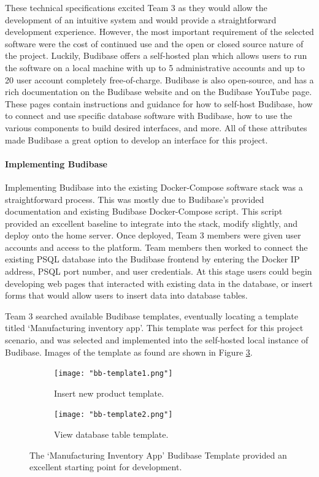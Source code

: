 \documentclass{article}
\begin{document}
These technical specifications excited Team 3 as they would allow the development of an intuitive system and would provide a 
straightforward development experience. However, the most important requirement of the selected software were the cost of continued use
and the open or closed source nature of the project. Luckily, Budibase offers a self-hosted plan which allows users to run the software 
on a local machine with up to 5 administrative accounts and up to 20 user account completely free-of-charge. Budibase is also open-source,
and has a rich documentation on the Budibase website \cite{budibase-docs} and on the Budibase YouTube page. \cite{budibase-youtube}
These pages contain instructions and guidance 
for how to self-host Budibase, how to connect and use specific database software with Budibase, how to use the various components to 
build desired interfaces, and more. All of these attributes made Budibase a great option to develop an interface for this project.
\paragraph{Implementing Budibase}
Implementing Budibase into the existing Docker-Compose software stack was a straightforward process. This was mostly due to Budibase's 
provided documentation and existing Budibase Docker-Compose script. This script provided an excellent baseline to integrate into the 
stack, modify slightly, and deploy onto the home server. Once deployed, Team 3 members were given user accounts and access to the 
platform. Team members then worked to connect the existing PSQL database into the Budibase frontend by entering the Docker IP 
address, PSQL port number, and user credentials. At this stage users could begin developing web pages that interacted with existing 
data in the database, or insert forms that would allow users to insert data into database tables.

Team 3 searched available Budibase templates, eventually locating a template titled `Manufacturing inventory app'. This template was 
perfect for this project scenario, and was selected and implemented into the self-hosted local instance of Budibase. Images of the 
template as found are shown in Figure \ref{fig:bb_templates}.

\begin{figure}[h!]
    \centering
    \begin{subfigure}[b]{\textwidth}
        \centering
        \texttt{[image: "bb-template1.png"]}
        \caption{Insert new product template.}
        \label{fig:bb_temp1}
    \end{subfigure}
    \begin{subfigure}[b]{\textwidth}
        \centering
        \texttt{[image: "bb-template2.png"]}
        \caption{View database table template.}
        \label{fig:bb_temp2}
    \end{subfigure}
    \caption{The `Manufacturing Inventory App' Budibase Template provided an excellent starting point for development.}
    \label{fig:bb_templates}
\end{figure}
\FloatBarrier
\end{document}
